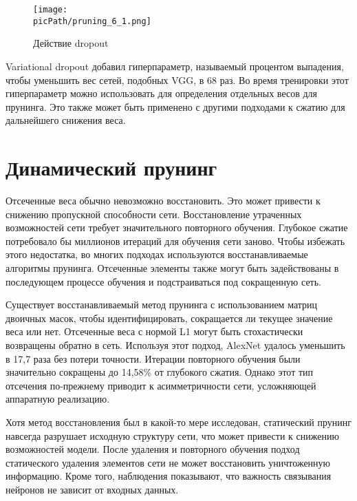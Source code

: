 \documentclass[oneside,final,12pt]{extreport}
\newcommand{\picPath}{images}
\begin{document}
\begin{figure}[H]
\begin{center}
  \texttt{[image: \\picPath/pruning\_6\_1.png]}
  \caption{Действие dropout}
  \label{fig:pruning_6}
  \end{center}
\end{figure}

Variational dropout добавил гиперпараметр, называемый процентом выпадения, чтобы уменьшить вес сетей, подобных VGG, в 68 раз. Во время тренировки этот гиперпараметр можно использовать для определения отдельных весов для прунинга. Это также может быть применено с другими подходами к сжатию для дальнейшего снижения веса.

\section{Динамический прунинг}
Отсеченные веса обычно невозможно восстановить. Это может привести к снижению пропускной способности сети. Восстановление утраченных возможностей сети требует значительного повторного обучения. Глубокое сжатие потребовало бы миллионов итераций для обучения сети заново. Чтобы избежать этого недостатка, во многих подходах используются восстанавливаемые алгоритмы прунинга. Отсеченные элементы также могут быть задействованы в последующем процессе обучения и подстраиваться под сокращенную сеть. 

Существует восстанавливаемый метод прунинга с использованием матриц двоичных масок, чтобы идентифицировать, сокращается ли текущее значение веса или нет. Отсеченные веса с нормой L1 могут быть стохастически возвращены обратно в сеть. Используя этот подход, AlexNet удалось уменьшить в 17,7 раза без потери точности. Итерации повторного обучения были значительно сокращены до 14,58\% от глубокого сжатия. Однако этот тип отсечения по-прежнему приводит к асимметричности сети, усложняющей аппаратную реализацию.

Хотя метод восстановления был в какой-то мере исследован, статический прунинг навсегда разрушает исходную структуру сети, что может привести к снижению возможностей модели. После удаления и повторного обучения подход статического удаления элементов сети не может восстановить уничтоженную информацию. Кроме того, наблюдения показывают, что важность связывания нейронов не зависит от входных данных.
\end{document}
